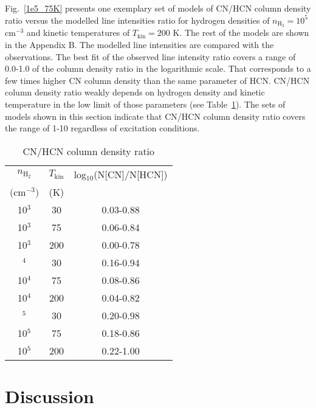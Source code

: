 \documentclass{aa}
\begin{document}
Fig.~\ref{1e5_75K} presents one exemplary set of models of CN/HCN column density ratio versus the modelled line intensities ratio for hydrogen densities of $n_\mathrm{H_2} = 10^5$ cm$^{-3}$ and kinetic temperatures of $T_\mathrm{kin} = 200$ K. The rest of the models are shown in the Appendix B. The modelled line intensities are compared with the observations. The best fit of the observed line intensity ratio covers a range of \mbox{0.0-1.0} of the column density ratio in the logarithmic scale. That corresponds to a few times higher CN column density than the same parameter of HCN. CN/HCN column density ratio weakly depends on hydrogen density and kinetic temperature in the low limit of those parameters (see Table~\ref{table:5}). The sets of models shown in this section indicate that CN/HCN column density ratio covers the range of 1-10 regardless of excitation conditions.

\begin{table}
\caption{CN/HCN column density ratio}             %
\label{table:5}      %
\centering                          %
\begin{tabular}{c c c} 
\hline\hline  
$n_\mathrm{H_2}$ & $T_\mathrm{kin}$ & log$_{10}$(N[CN]/N[HCN]) \\
$($cm$^{-3})$ & (K) & \\
\hline
10$^{3}$ & 30 & 0.03-0.88\\
10$^{3}$ & 75 & 0.06-0.84\\
10$^{3}$ & 200 & 0.00-0.78\\ \hdashline
10$^{4}$ & 30 & 0.16-0.94\\
10$^{4}$ & 75 & 0.08-0.86\\
10$^{4}$ & 200 & 0.04-0.82\\ \hdashline
10$^{5}$ & 30 & 0.20-0.98\\
10$^{5}$ & 75 & 0.18-0.86\\
10$^{5}$ & 200 & 0.22-1.00\\ \hline
\end{tabular}
\end{table} 


\section{Discussion}
\end{document}

